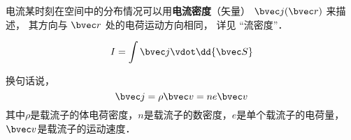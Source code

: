 

电流某时刻在空间中的分布情况可以用\textbf{电流密度}（矢量） $\bvec j(\bvec r)$ 来描述， 其方向与 $\bvec r$ 处的电荷运动方向相同， 详见 “流密度”．

\begin{equation}
I = \int \bvec j \vdot \dd{\bvec S}
\end{equation}

换句话说，
\begin{equation}
\bvec j = \rho \bvec v = ne \bvec v
\end{equation}
其中$\rho$是载流子的体电荷密度，$n$是载流子的数密度，$e$是单个载流子的电荷量，$\bvec v$是载流子的运动速度\cite{GriffE}．
